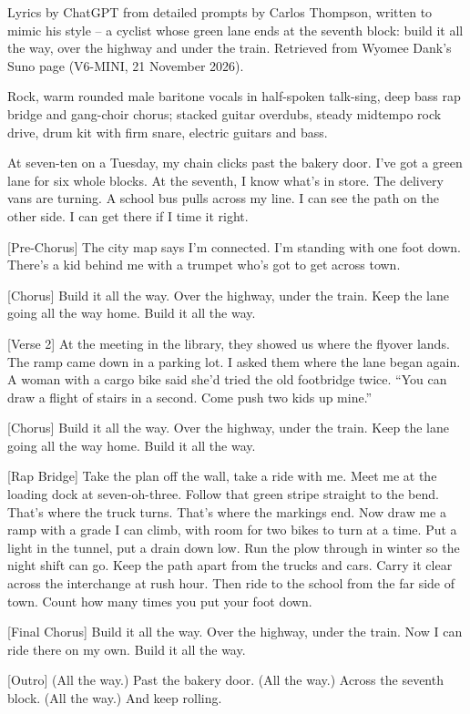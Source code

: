 \begin{notes}
Lyrics by ChatGPT from detailed prompts by Carlos Thompson, written to mimic his style -- a cyclist whose green lane ends at the seventh block: build it all the way, over the highway and under the train. Retrieved from Wyomee Dank's Suno page (V6-MINI, 21 November 2026).
\end{notes}
\begin{style}
Rock, warm rounded male baritone vocals in half-spoken talk-sing, deep bass rap bridge and gang-choir chorus; stacked guitar overdubs, steady midtempo rock drive, drum kit with firm snare, electric guitars and bass.
\end{style}
\begin{lyrics}
[Verse 1]
At seven-ten on a Tuesday,
my chain clicks past the bakery door.
I’ve got a green lane for six whole blocks.
At the seventh, I know what’s in store.
The delivery vans are turning.
A school bus pulls across my line.
I can see the path on the other side.
I can get there if I time it right.

[Pre-Chorus]
The city map says I’m connected.
I’m standing with one foot down.
There’s a kid behind me with a trumpet
who’s got to get across town.

[Chorus]
Build it all the way.
Over the highway, under the train.
Keep the lane going all the way home.
Build it all the way.

[Verse 2]
At the meeting in the library,
they showed us where the flyover lands.
The ramp came down in a parking lot.
I asked them where the lane began again.
A woman with a cargo bike
said she’d tried the old footbridge twice.
“You can draw a flight of stairs in a second.
Come push two kids up mine.”

[Chorus]
Build it all the way.
Over the highway, under the train.
Keep the lane going all the way home.
Build it all the way.

[Rap Bridge]
Take the plan off the wall, take a ride with me.
Meet me at the loading dock at seven-oh-three.
Follow that green stripe straight to the bend.
That’s where the truck turns. That’s where the markings end.
Now draw me a ramp with a grade I can climb,
with room for two bikes to turn at a time.
Put a light in the tunnel, put a drain down low.
Run the plow through in winter so the night shift can go.
Keep the path apart from the trucks and cars.
Carry it clear across the interchange at rush hour.
Then ride to the school from the far side of town.
Count how many times you put your foot down.

[Final Chorus]
Build it all the way.
Over the highway, under the train.
Now I can ride there on my own.
Build it all the way.

[Outro]
(All the way.)
Past the bakery door.
(All the way.)
Across the seventh block.
(All the way.)
And keep rolling.
\end{lyrics}


